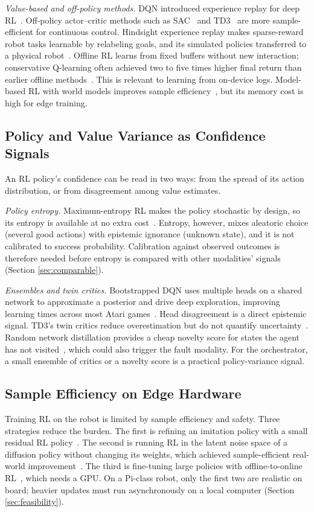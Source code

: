 \documentclass[journal]{IEEEtran}
\begin{document}
\textit{Value-based and off-policy methods.} DQN introduced experience replay for deep RL~\cite{Mnih2015}. Off-policy actor--critic methods such as SAC~\cite{Haarnoja2018} and TD3~\cite{Fujimoto2018} are more sample-efficient for continuous control. Hindsight experience replay makes sparse-reward robot tasks learnable by relabeling goals, and its simulated policies transferred to a physical robot~\cite{Andrychowicz2017}. Offline RL learns from fixed buffers without new interaction; conservative Q-learning often achieved two to five times higher final return than earlier offline methods~\cite{Kumar2020}. This is relevant to learning from on-device logs. Model-based RL with world models improves sample efficiency~\cite{Hafner2023}, but its memory cost is high for edge training.


\subsection{Policy and Value Variance as Confidence Signals}\label{sec:rlconf}
An RL policy's confidence can be read in two ways: from the spread of its action distribution, or from disagreement among value estimates.

\textit{Policy entropy.} Maximum-entropy RL makes the policy stochastic by design, so its entropy is available at no extra cost~\cite{Haarnoja2018}. Entropy, however, mixes aleatoric choice (several good actions) with epistemic ignorance (unknown state), and it is not calibrated to success probability. Calibration against observed outcomes is therefore needed before entropy is compared with other modalities' signals (Section \ref{sec:comparable}).

\textit{Ensembles and twin critics.} Bootstrapped DQN uses multiple heads on a shared network to approximate a posterior and drive deep exploration, improving learning times across most Atari games~\cite{Osband2016}. Head disagreement is a direct epistemic signal. TD3's twin critics reduce overestimation but do not quantify uncertainty~\cite{Fujimoto2018}. Random network distillation provides a cheap novelty score for states the agent has not visited~\cite{Burda2019}, which could also trigger the fault modality. For the orchestrator, a small ensemble of critics or a novelty score is a practical policy-variance signal.


\subsection{Sample Efficiency on Edge Hardware}\label{sec:rledge}
Training RL on the robot is limited by sample efficiency and safety. Three strategies reduce the burden. The first is refining an imitation policy with a small residual RL policy~\cite{Yuan2025,Ankile2025}. The second is running RL in the latent noise space of a diffusion policy without changing its weights, which achieved sample-efficient real-world improvement~\cite{Wagenmaker2025}. The third is fine-tuning large policies with offline-to-online RL~\cite{Mark2025,Chen2025,Lu2025,Li2026}, which needs a GPU. On a Pi-class robot, only the first two are realistic on board; heavier updates must run asynchronously on a local computer (Section \ref{sec:feasibility}).
\end{document}
